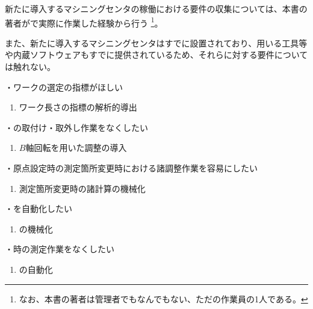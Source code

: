 

新たに導入するマシニングセンタの稼働における要件の収集については、本書の著者が\MMC で実際に作業した経験から行う
\footnote{なお、本書の著者は管理者でもなんでもない、ただの作業員の1人である。}。

また、新たに導入するマシニングセンタはすでに設置されており、用いる工具等や内蔵ソフトウェアもすでに提供されているため、それらに対する要件については触れない。



・ワーク\FixtureBolt の選定の指標がほしい
\begin{enumerate}[label=\sarrow]
\item ワーク\FixtureBolt 長さの指標の解析的導出
\end{enumerate}
・\Spacer の取付け・取外し作業をなくしたい
\begin{enumerate}[label=\sarrow]
\item $B$軸回転を用いた\AlocationLength 調整の導入
\end{enumerate}



・原点設定時の測定箇所変更時における諸調整作業を容易にしたい
\begin{enumerate}[label=\sarrow]
\item 測定箇所変更時の諸計算の機械化
\end{enumerate}
・\CenterlineEndFaceDifMeasurement を自動化したい
\begin{enumerate}[label=\sarrow]
\item \CenterlineEndFaceDifMeasurement の機械化
\end{enumerate}
・\CurvedOutcutMilling 時の測定作業をなくしたい
\begin{enumerate}[label=\sarrow]
\item \CurvedOutcutMilling の自動化
\end{enumerate}



